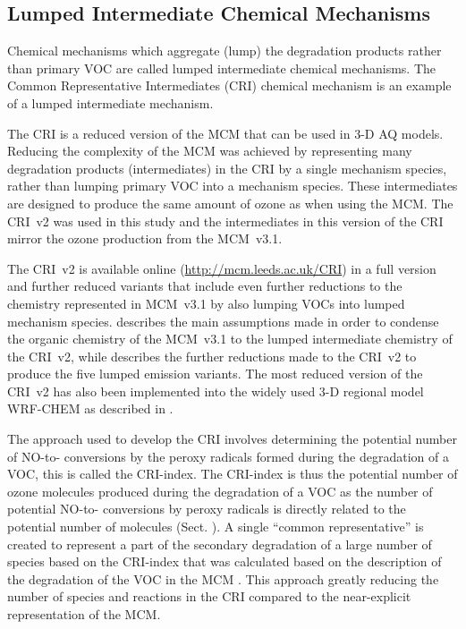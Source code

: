 \subsection{Lumped Intermediate Chemical Mechanisms} \label{ss:lumped_intermediate}
Chemical mechanisms which aggregate (lump) the degradation products rather than primary VOC are called lumped intermediate chemical mechanisms.
The Common Representative Intermediates (CRI) chemical mechanism \citep{Jenkin:2008} is an example of a lumped intermediate mechanism.

The CRI is a reduced version of the MCM that can be used in 3-D AQ models.
Reducing the complexity of the MCM was achieved by representing many degradation products (intermediates) in the CRI by a single mechanism species, rather than lumping primary VOC into a mechanism species.
These intermediates are designed to produce the same amount of ozone as when using the MCM.
The CRI~v2 was used in this study and the intermediates in this version of the CRI mirror the ozone production from the MCM~v3.1.

The CRI~v2 is available online (\mbox{\url{http://mcm.leeds.ac.uk/CRI}}) in a full version and further reduced variants that include even further reductions to the chemistry represented in MCM~v3.1 by also lumping VOCs into lumped mechanism species.
\citet{Jenkin:2008} describes the main assumptions made in order to condense the organic chemistry of the MCM~v3.1 to the lumped intermediate chemistry of the CRI~v2, while \citet{Watson:2008} describes the further reductions made to the CRI~v2 to produce the five lumped emission variants.
The most reduced version of the CRI~v2 has also been implemented into the widely used 3-D regional model WRF-CHEM as described in \citet{Archer-Nicholls:2014}.

The approach used to develop the CRI involves determining the potential number of NO-to- conversions by the peroxy radicals formed during the degradation of a VOC, this is called the CRI-index.
The CRI-index is thus the potential number of ozone molecules produced during the degradation of a VOC as the number of potential NO-to- conversions by peroxy radicals is directly related to the potential number of  molecules (Sect. ).
A single ``common representative'' is created to represent a part of the secondary degradation of a large number of species based on the CRI-index that was calculated based on the description of the degradation of the VOC in the MCM \citep{Jenkin:2008}.
This approach greatly reducing the number of species and reactions in the CRI compared to the near-explicit representation of the MCM.

